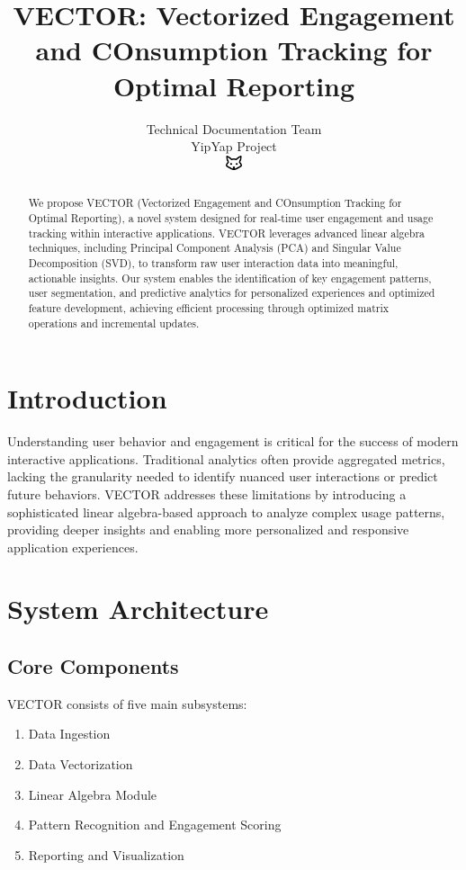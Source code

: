 \documentclass[10pt]{article}
\begin{document}
\title{VECTOR: Vectorized Engagement and COnsumption Tracking for Optimal Reporting}

\author{Technical Documentation Team\\
YipYap Project\\
\includegraphics[width=0.5cm]{favicon.pdf}}

\maketitle

\begin{abstract}
We propose VECTOR (Vectorized Engagement and COnsumption Tracking for Optimal Reporting), a novel system designed for real-time user engagement and usage tracking within interactive applications. VECTOR leverages advanced linear algebra techniques, including Principal Component Analysis (PCA) and Singular Value Decomposition (SVD), to transform raw user interaction data into meaningful, actionable insights. Our system enables the identification of key engagement patterns, user segmentation, and predictive analytics for personalized experiences and optimized feature development, achieving efficient processing through optimized matrix operations and incremental updates.
\end{abstract}

\section{Introduction}
Understanding user behavior and engagement is critical for the success of modern interactive applications. Traditional analytics often provide aggregated metrics, lacking the granularity needed to identify nuanced user interactions or predict future behaviors. VECTOR addresses these limitations by introducing a sophisticated linear algebra-based approach to analyze complex usage patterns, providing deeper insights and enabling more personalized and responsive application experiences.

\section{System Architecture}
\subsection{Core Components}
VECTOR consists of five main subsystems:
\begin{enumerate}
    \item Data Ingestion
    \item Data Vectorization
    \item Linear Algebra Module
    \item Pattern Recognition and Engagement Scoring
    \item Reporting and Visualization
\end{enumerate}
\end{document}
